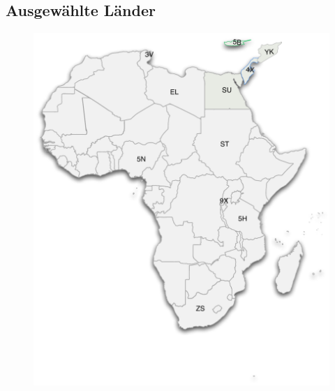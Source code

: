 \documentclass[11pt,BCOR=8.5mm]{scrartcl}
\begin{document}
\subsection{Ausgewählte Länder}\label{sub:weltkarte}

\begin{figure}[htbp]
  \begin{center}
	\includegraphics[width=14cm]{figures/landeskenner-afrika}
	\label{fig:landeskenner-afrika}
  \end{center}
\end{figure}
\end{document}
